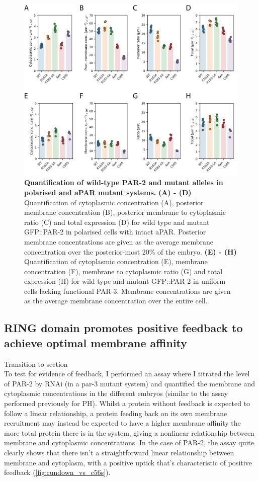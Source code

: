 \documentclass[12pt]{"article"}
\newcommand{\mycaption}[2]{\caption[#1]{\textbf{#1.} #2}}
\begin{document}
\begin{figure}
\includegraphics[scale=0.95]{par2_misc_mutants_quantification}
\centering
\mycaption{Quantification of wild-type PAR-2 and mutant alleles in polarised and aPAR mutant systems}{
\textbf{(A) - (D)} Quantification of cytoplasmic concentration (A), posterior membrane concentration (B), posterior membrane to cytoplasmic ratio (C) and total expression (D) for wild type and mutant GFP::PAR-2 in polarised cells with intact aPAR. Posterior membrane concentrations are given as the average membrane concentration over the posterior-most 20\% of the embryo.
\textbf{(E) - (H)} Quantification of cytoplasmic concentration (E), membrane concentration (F), membrane to cytoplasmic ratio (G) and total expression (H) for wild type and mutant GFP::PAR-2 in uniform cells lacking functional PAR-3.  Membrane concentrations are given as the average membrane concentration over the entire cell.
}
\label{fig:par2_misc_mutants_quantification}
\end{figure}

\clearpage
\subsection{RING domain promotes positive feedback to achieve optimal membrane affinity}

Transition to section\\

To test for evidence of feedback, I performed an assay where I titrated the level of PAR-2 by RNAi (in a par-3 mutant system) and quantified the membrane and cytoplasmic concentrations in the different embryos (similar to the assay performed previously for PH). Whilst a protein without feedback is expected to follow a linear relationship, a protein feeding back on its own membrane recruitment may instead be expected to have a higher membrane affinity the more total protein there is in the system, giving a nonlinear relationship between membrane and cytoplasmic concentrations. In the case of PAR-2, the assay quite clearly shows that there isn't a straightforward linear relationship between membrane and cytoplasm, with a positive uptick that's characteristic of positive feedback (\cref{fig:rundown_vs_c56s}).\\
\end{document}
